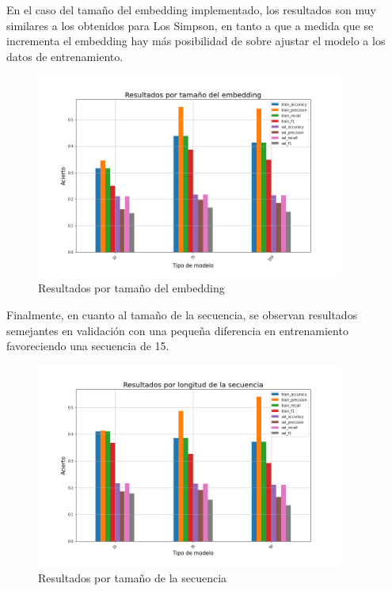 En el caso del tamaño del embedding implementado, los resultados son muy similares a los obtenidos para Los Simpson, en tanto a que a medida que se incrementa el embedding hay más posibilidad de sobre ajustar el modelo a los datos de entrenamiento.\\

\begin{figure}
    \centering
    \includegraphics[width=0.9\textwidth]{results/friends/deepModels/sim_res_deep_em_size.png}
    \caption{Resultados por tamaño del embedding}
    \label{fig:fri_deep_em_size}
\end{figure}

Finalmente, en cuanto al tamaño de la secuencia, se observan resultados semejantes en validación con una pequeña diferencia en entrenamiento favoreciendo una secuencia de 15.\\

\begin{figure}
    \centering
    \includegraphics[width=0.9\textwidth]{results/friends/deepModels/sim_res_deep_seq_len.png}
    \caption{Resultados por tamaño de la secuencia}
    \label{fig:fri_deep_seq_len}
\end{figure}

